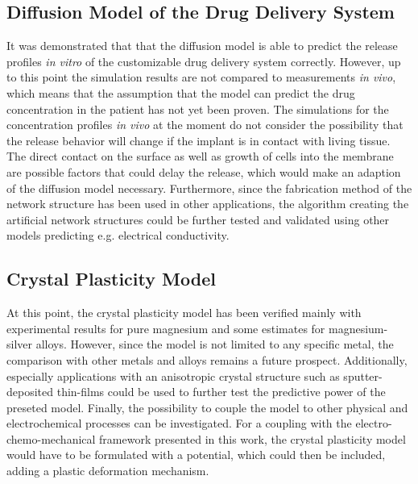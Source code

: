 \subsection*{Diffusion Model of the Drug Delivery System}
It was demonstrated that that the diffusion model is able to predict the release profiles \textit{in vitro} of the customizable drug delivery system correctly. However, up to this point the simulation results are not compared to measurements \textit{in vivo}, which means that the assumption that the model can predict the drug concentration in the patient has not yet been proven. The simulations for the concentration profiles \textit{in vivo} at the moment do not consider the possibility that the release behavior will change if the implant is in contact with living tissue. The direct contact on the surface as well as growth of cells into the membrane are possible factors that could delay the release, which would make an adaption of the diffusion model necessary. Furthermore, since the fabrication method of the network structure has been used in other applications\supercite{schutt_electrically_2021,reimers_multifunctional_2023}, the algorithm creating the artificial network structures could be further tested and validated using other models predicting e.g. electrical conductivity. 

\subsection*{Crystal Plasticity Model}
At this point, the crystal plasticity model has been verified mainly with experimental results for pure magnesium and some estimates for magnesium-silver alloys. However, since the model is not limited to any specific metal, the comparison with other metals and alloys remains a future prospect. Additionally, especially applications with an anisotropic crystal structure such as sputter-deposited thin-films could be used to further test the predictive power of the preseted model. Finally, the possibility to couple the model to other physical and electrochemical processes can be investigated. For a coupling with the electro-chemo-mechanical framework presented in this work, the crystal plasticity model would have to be formulated with a potential, which could then be included, adding a plastic deformation mechanism.  

